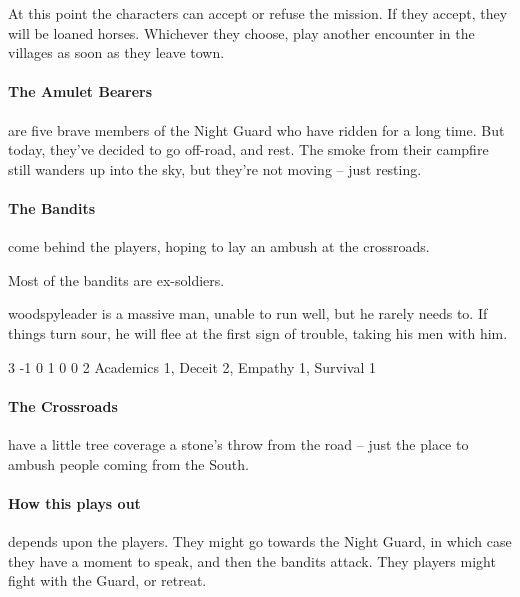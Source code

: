 \begin{multicols}{2}
At this point the characters can accept or refuse the mission.  If they accept, they will be loaned horses.  Whichever they choose, play another encounter in the villages as soon as they leave town.

\paragraph{The Amulet Bearers} are five brave members of the Night Guard who have ridden for a long time.  But today, they've decided to go off-road, and rest.  The smoke from their campfire still wanders up into the sky, but they're not moving -- just resting.


\humansoldier

\paragraph{The Bandits} come behind the players, hoping to lay an ambush at the crossroads.


Most of the bandits are ex-soldiers.

\humansoldier

\label{woodspyleader}

\Gls{woodspyleader} is a massive man, unable to run well, but he rarely needs to.
If things turn sour, he will flee at the first sign of trouble, taking his men with him.

{3}%
{-1}%
{{0}%
{1}%
{0}}%
{0}%
{2}%
{Academics 1, Deceit 2, Empathy 1, Survival 1}%
{\greataxe}%
{}


\paragraph{The Crossroads} have a little tree coverage a stone's throw from the road -- just the place to ambush people coming from the South.

\paragraph{How this plays out} depends upon the players.
They might go towards the Night Guard, in which case they have a moment to speak, and then the bandits attack.
They players might fight with the Guard, or retreat.


\end{multicols}
